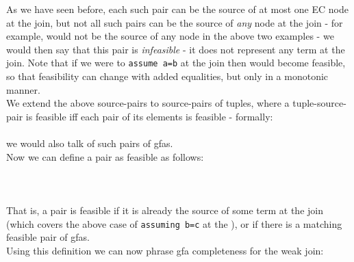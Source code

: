 As we have seen before, each such pair can be the source of at most one EC node at the join, 
but not all such pairs can be the source of \emph{any} node at the join - for example,  
would not be the source of any node in the above two examples - we would then say that this pair is \emph{infeasible} - it does not represent any term at the join. Note that if we were to \lstinline{assume a=b} at the join then  would become feasible, 
so that feasibility can change with added equalities, but only in a monotonic manner.\\
We extend the above source-pairs to source-pairs of tuples, where a tuple-source-pair is feasible iff each pair of its elements is feasible - formally:\\
\\
we would also talk of such pairs of gfas.\\
Now we can define a pair as feasible as follows:\\
\\
\\
\\
That is, a pair is feasible if it is already the source of some term at the join (which covers the above case of \lstinline{assuming b=c} at the ), or if there is a matching feasible pair of gfas.\\
Using this definition we can now phrase gfa completeness for the weak join:\\
\\

